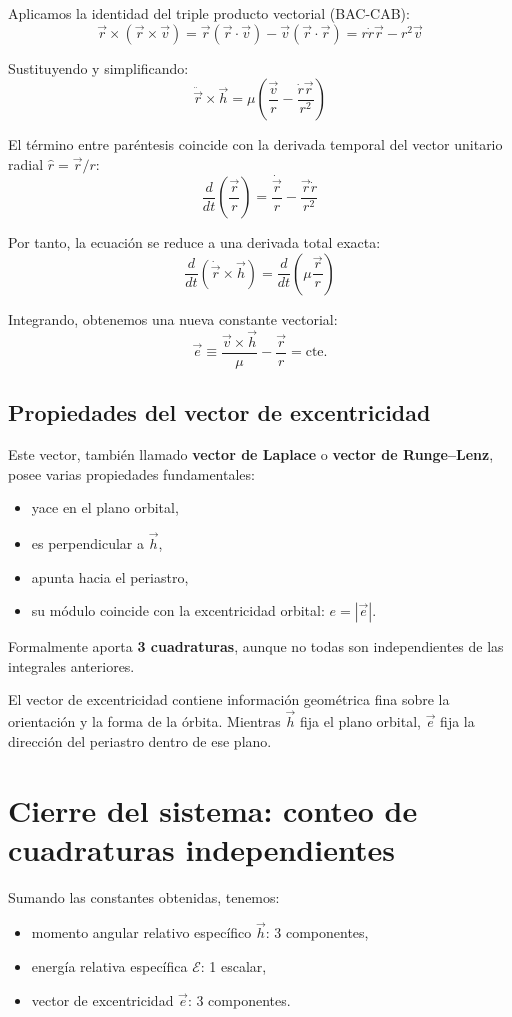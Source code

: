 Aplicamos la identidad del triple producto vectorial (BAC-CAB):
\[
\vec{r} \times (\vec{r} \times \vec{v}) = \vec{r}(\vec{r} \cdot \vec{v}) - \vec{v}(\vec{r} \cdot \vec{r}) = r\dot{r}\vec{r} - r^2\vec{v}
\]

Sustituyendo y simplificando:
\[
\ddot{\vec{r}} \times \vec{h} = \mu\left(\frac{\vec{v}}{r} - \frac{\dot{r}\vec{r}}{r^2}\right)
\]

El término entre paréntesis coincide con la derivada temporal del vector unitario radial \(\hat{r} = \vec{r}/r\):
\[
\frac{d}{dt}\left(\frac{\vec{r}}{r}\right) = \frac{\dot{\vec{r}}}{r} - \frac{\vec{r}\dot{r}}{r^2}
\]

Por tanto, la ecuación se reduce a una derivada total exacta:
\[
\frac{d}{dt}(\dot{\vec{r}} \times \vec{h}) = \frac{d}{dt}\left(\mu\frac{\vec{r}}{r}\right)
\]

Integrando, obtenemos una nueva constante vectorial:
\[
\vec{e} \equiv \frac{\vec{v} \times \vec{h}}{\mu} - \frac{\vec{r}}{r} = \text{cte.}
\]

\subsection{Propiedades del vector de excentricidad}
Este vector, también llamado \textbf{vector de Laplace} o \textbf{vector de Runge--Lenz}, posee varias propiedades fundamentales:
\begin{itemize}
    \item yace en el plano orbital,
    \item es perpendicular a \(\vec{h}\),
    \item apunta hacia el periastro,
    \item su módulo coincide con la excentricidad orbital: \(e = |\vec{e}|\).
\end{itemize}

Formalmente aporta \textbf{3 cuadraturas}, aunque no todas son independientes de las integrales anteriores.

\begin{importante}
El vector de excentricidad contiene información geométrica fina sobre la orientación y la forma de la órbita. Mientras \(\vec{h}\) fija el plano orbital, \(\vec{e}\) fija la dirección del periastro dentro de ese plano.
\end{importante}

\section{Cierre del sistema: conteo de cuadraturas independientes}
Sumando las constantes obtenidas, tenemos:
\begin{itemize}
    \item momento angular relativo específico \(\vec{h}\): 3 componentes,
    \item energía relativa específica \(\mathcal{E}\): 1 escalar,
    \item vector de excentricidad \(\vec{e}\): 3 componentes.
\end{itemize}


